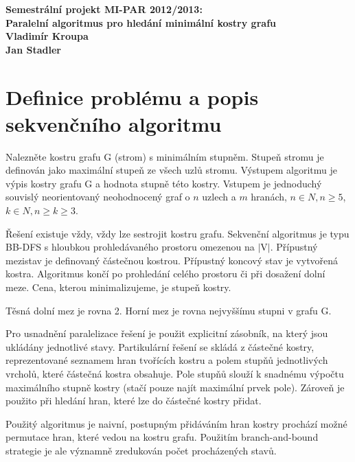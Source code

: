 \documentclass[12pt]{article}
\begin{document}

\begin{center}
\bf Semestrální projekt MI-PAR 2012/2013:\\[5mm]
    Paralelní algoritmus pro hledání minimální kostry grafu\\[5mm]
       Vladimír Kroupa\\
       Jan Stadler\\[2mm]
\end{center}

\section{Definice problému a popis sekvenčního algoritmu}

Nalezněte kostru grafu G (strom) s minimálním stupněm. Stupeň stromu je definován jako maximální stupeň ze všech uzlů stromu. Výstupem algoritmu je výpis kostry grafu G a hodnota stupně této kostry. Vstupem je  jednoduchý souvislý neorientovaný neohodnocený graf o $n$ uzlech a $m$ hranách, $n \in N, n \ge 5$, $k \in N, n \ge k \ge 3 $.

Řešení existuje vždy, vždy lze sestrojit kostru grafu. Sekvenční algoritmus je typu BB-DFS s hloubkou prohledávaného prostoru omezenou na $\vert$V$\vert$. Přípustný mezistav je definovaný částečnou kostrou. Přípustný koncový stav je vytvořená kostra. Algoritmus končí po prohledání celého prostoru či při dosažení dolní meze. Cena, kterou minimalizujeme, je stupeň kostry.

Těsná dolní mez je rovna 2. Horní mez je rovna nejvyššímu stupni v grafu G.

Pro usnadnění paralelizace řešení je použit explicitní zásobník, na který jsou ukládány jednotlivé stavy. Partikulární řešení se skládá z částečné kostry, reprezentované seznamem hran tvořících kostru a polem stupňů jednotlivých vrcholů, které částečná kostra obsahuje. Pole stupňů slouží k snadnému výpočtu maximálního stupně kostry (stačí pouze najít maximální prvek pole). Zároveň je použito při hledání hran, které lze do částečné kostry přidat. 

Použitý algoritmus je naivní, postupným přidáváním hran kostry prochází možné permutace hran, které vedou na kostru grafu. Použitím branch-and-bound strategie je ale významně zredukován počet procházených stavů.
\end{document}
